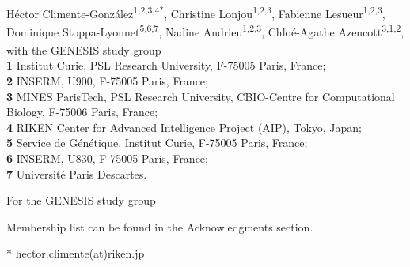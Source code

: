 \documentclass[10pt,letterpaper]{article}
\begin{document}
\vspace*{0.2in}

\begin{flushleft}
{\Large
\textbf{} %
}
\newline
\\
Héctor Climente-González\textsuperscript{1,2,3,4*}, 
Christine Lonjou\textsuperscript{1,2,3}, 
Fabienne Lesueur\textsuperscript{1,2,3},
Dominique Stoppa-Lyonnet\textsuperscript{5,6,7\textcurrency}, 
Nadine Andrieu\textsuperscript{1,2,3}, 
Chloé-Agathe Azencott\textsuperscript{3,1,2},
with the GENESIS study group\textsuperscript{\textpilcrow}
\\
\bigskip
\textbf{1} Institut Curie, PSL Research University, F-75005 Paris, France;\\
\textbf{2} INSERM, U900, F-75005 Paris, France;\\
\textbf{3} MINES ParisTech, PSL Research University, CBIO-Centre for Computational Biology, F-75006 Paris, France;\\
\textbf{4} RIKEN Center for Advanced Intelligence Project (AIP), Tokyo, Japan; \\
\textbf{5} Service de Génétique, Institut Curie, F-75005 Paris, France;\\
\textbf{6} INSERM, U830, F-75005 Paris, France;\\
\textbf{7} Université Paris Descartes.\\
\bigskip

% 
%


\textcurrency For the GENESIS study group %


\textpilcrow Membership list can be found in the Acknowledgments section.

* hector.climente(at)riken.jp

\end{flushleft}
\end{document}
